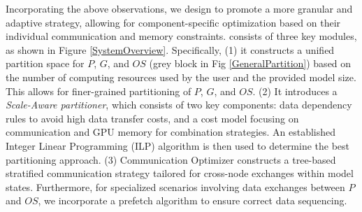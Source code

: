 





Incorporating the above observations, we design \SysName to promote a more granular and adaptive strategy, allowing for component-specific optimization based on their individual communication and memory constraints. \SysName consists of three key modules, as shown in Figure \ref{SystemOverview}. Specifically, (1) it constructs a unified partition space for $P$, $G$, and $OS$ (grey block in Fig \ref{GeneralPartition}) based on the number of computing resources used by the user and the provided model size. This allows for finer-grained partitioning of $P$, $G$, and $OS$. (2) It introduces a \emph{Scale-Aware partitioner}, which consists of two key components: data dependency rules to avoid high data transfer costs, and a cost model focusing on communication and GPU memory for combination strategies. An established Integer Linear Programming (ILP) algorithm is then used to determine the best partitioning approach. (3) Communication Optimizer constructs a tree-based stratified communication strategy tailored for cross-node exchanges within model states. Furthermore, for specialized scenarios involving data exchanges between $P$ and $OS$, we incorporate a prefetch algorithm to ensure correct data sequencing.





